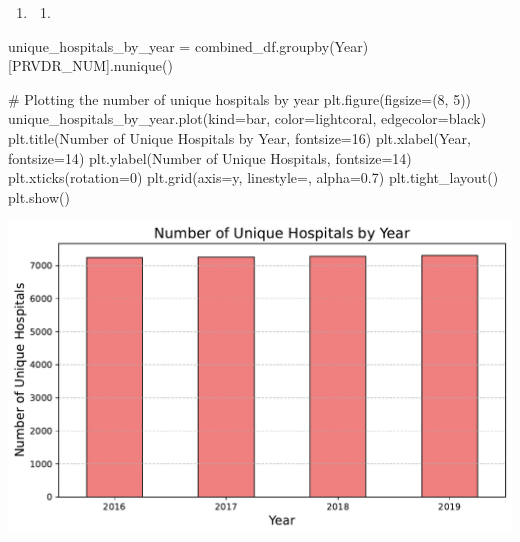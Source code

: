 \documentclass[
  letterpaper,
  DIV=11,
  numbers=noendperiod]{scrartcl}
\newenvironment{Shaded}{\begin{snugshade}}{\end{snugshade}}
\newcommand{\CommentTok}[1]{\textcolor[rgb]{0.37,0.37,0.37}{#1}}
\newcommand{\DecValTok}[1]{\textcolor[rgb]{0.68,0.00,0.00}{#1}}
\newcommand{\FloatTok}[1]{\textcolor[rgb]{0.68,0.00,0.00}{#1}}
\newcommand{\NormalTok}[1]{\textcolor[rgb]{0.00,0.23,0.31}{#1}}
\newcommand{\OperatorTok}[1]{\textcolor[rgb]{0.37,0.37,0.37}{#1}}
\newcommand{\StringTok}[1]{\textcolor[rgb]{0.13,0.47,0.30}{#1}}
\providecommand{\tightlist}{%
  \setlength{\itemsep}{0pt}\setlength{\parskip}{0pt}}\usepackage{longtable,booktabs,array}
\begin{document}
\begin{enumerate}
\def\labelenumi{\arabic{enumi}.}
\setcounter{enumi}{3}
\tightlist
\item
  \begin{enumerate}
  \def\labelenumii{\alph{enumii}.}
  \tightlist
  \item
  \end{enumerate}
\end{enumerate}

\begin{Shaded}
\begin{Highlighting}[]
\NormalTok{unique\_hospitals\_by\_year }\OperatorTok{=}\NormalTok{ combined\_df.groupby(}\StringTok{\textquotesingle{}Year\textquotesingle{}}\NormalTok{)[}\StringTok{\textquotesingle{}PRVDR\_NUM\textquotesingle{}}\NormalTok{].nunique()}

\CommentTok{\# Plotting the number of unique hospitals by year}
\NormalTok{plt.figure(figsize}\OperatorTok{=}\NormalTok{(}\DecValTok{8}\NormalTok{, }\DecValTok{5}\NormalTok{))}
\NormalTok{unique\_hospitals\_by\_year.plot(kind}\OperatorTok{=}\StringTok{\textquotesingle{}bar\textquotesingle{}}\NormalTok{, color}\OperatorTok{=}\StringTok{\textquotesingle{}lightcoral\textquotesingle{}}\NormalTok{, edgecolor}\OperatorTok{=}\StringTok{\textquotesingle{}black\textquotesingle{}}\NormalTok{)}
\NormalTok{plt.title(}\StringTok{\textquotesingle{}Number of Unique Hospitals by Year\textquotesingle{}}\NormalTok{, fontsize}\OperatorTok{=}\DecValTok{16}\NormalTok{)}
\NormalTok{plt.xlabel(}\StringTok{\textquotesingle{}Year\textquotesingle{}}\NormalTok{, fontsize}\OperatorTok{=}\DecValTok{14}\NormalTok{)}
\NormalTok{plt.ylabel(}\StringTok{\textquotesingle{}Number of Unique Hospitals\textquotesingle{}}\NormalTok{, fontsize}\OperatorTok{=}\DecValTok{14}\NormalTok{)}
\NormalTok{plt.xticks(rotation}\OperatorTok{=}\DecValTok{0}\NormalTok{)}
\NormalTok{plt.grid(axis}\OperatorTok{=}\StringTok{\textquotesingle{}y\textquotesingle{}}\NormalTok{, linestyle}\OperatorTok{=}\StringTok{\textquotesingle{}{-}{-}\textquotesingle{}}\NormalTok{, alpha}\OperatorTok{=}\FloatTok{0.7}\NormalTok{)}
\NormalTok{plt.tight\_layout()}
\NormalTok{plt.show()}
\end{Highlighting}
\end{Shaded}

\includegraphics{pset4_submission_files/figure-pdf/cell-7-output-1.pdf}
\end{document}
